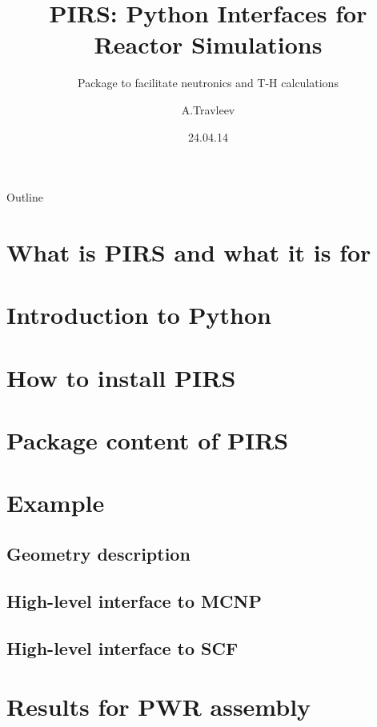 \documentclass[t]{beamer}
\date{24.04.14}
\title[INR seminar, about PIRS]{PIRS: Python Interfaces for Reactor Simulations}
\subtitle{Package to facilitate neutronics and T-H calculations}
\author{A.Travleev}
\institute{Institute for Neutron Physics and Reactor Technology}
\begin{document}
\begin{frame}
  \maketitle
\end{frame}

\begin{frame}{Outline}
    \tableofcontents
\end{frame}


\section{What is PIRS and what it is for}


\section{Introduction to Python}

\section{How to install PIRS}


\section{Package content of PIRS}



\section{Example}
\subsection{Geometry description}


\subsection{High-level interface to MCNP}


\subsection{High-level interface to SCF}


\section{Results for PWR assembly}

\end{document}
